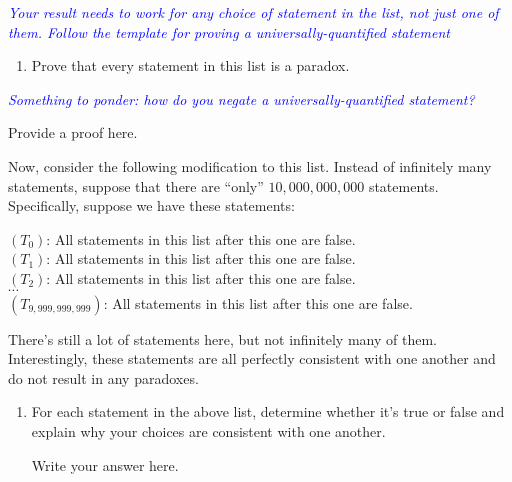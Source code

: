 \documentclass{article}
\renewcommand{\(}{\left(}
\renewcommand{\)}{\right)}
\theoremstyle{plain}
\theoremstyle{plain}
\theoremstyle{definition}
\begin{document}
\textit{\textcolor{blue}{Your result needs to work for any choice of statement in the list, not just one of them. Follow the template for proving a universally-quantified statement}}

\begin{enumerate}[resume*]

\item Prove that every statement in this list is a paradox. 

\end{enumerate}

\textit{\textcolor{blue}{Something to ponder: how do you negate a universally-quantified statement?}}

\begin{shaded}
Provide a proof here.
\end{shaded}

Now, consider the following modification to this list.
Instead of infinitely many statements,
suppose that there are ``only'' $10,000,000,000$ statements.
Specifically, suppose we have these statements:
\begin{mdframed}[backgroundcolor=yellow!20] 
\begin{center}
$(T_0)$: All statements in this list after this one are false. \\
$(T_1)$: All statements in this list after this one are false. \\
$(T_2)$: All statements in this list after this one are false. \\
$\cdots$ \\
$(T_{9,999,999,999})$: All statements in this list after this one are false.
\end{center}
\end{mdframed}
There's still a lot of statements here,
but not infinitely many of them.
Interestingly,
these statements are all perfectly consistent with one another and do not
result in any paradoxes.

\begin{enumerate}[resume*]

\item For each statement in the above list,
determine whether it's true or false and explain why
your choices are consistent with one another.

\begin{shaded}
Write your answer here.
\end{shaded}

\end{enumerate}
\end{document}
